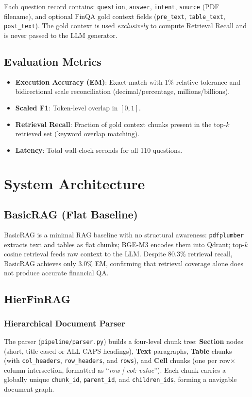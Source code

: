 \documentclass[conference]{IEEEtran}
\begin{document}
Each question record contains: \texttt{question}, \texttt{answer},
\texttt{intent}, \texttt{source} (PDF filename), and optional FinQA gold
context fields (\texttt{pre\_text}, \texttt{table\_text}, \texttt{post\_text}).
The gold context is used \emph{exclusively} to compute Retrieval Recall
and is never passed to the LLM generator.

\subsection{Evaluation Metrics}
\begin{itemize}
  \item \textbf{Execution Accuracy (EM)}: Exact-match with 1\% relative
        tolerance and bidirectional scale reconciliation (decimal/percentage,
        millions/billions).
  \item \textbf{Scaled F1}: Token-level overlap in $[0,1]$.
  \item \textbf{Retrieval Recall}: Fraction of gold context chunks present
        in the top-$k$ retrieved set (keyword overlap matching).
  \item \textbf{Latency}: Total wall-clock seconds for all 110 questions.
\end{itemize}

\section{System Architecture}

\subsection{BasicRAG (Flat Baseline)}
BasicRAG is a minimal RAG baseline with no structural awareness:
\texttt{pdfplumber} extracts text and tables as flat chunks; BGE-M3 encodes
them into Qdrant; top-$k$ cosine retrieval feeds raw context to the LLM.
Despite 80.3\% retrieval recall, BasicRAG achieves only 3.0\% EM, confirming
that retrieval coverage alone does not produce accurate financial QA.

\subsection{HierFinRAG}

\subsubsection{Hierarchical Document Parser}
The parser (\texttt{pipeline/parser.py}) builds a four-level chunk tree:
\textbf{Section} nodes (short, title-cased or ALL-CAPS headings),
\textbf{Text} paragraphs, \textbf{Table} chunks (with \texttt{col\_headers},
\texttt{row\_headers}, and \texttt{rows}), and \textbf{Cell} chunks (one per
row$\times$column intersection, formatted as ``\textit{row | col: value}'').
Each chunk carries a globally unique \texttt{chunk\_id}, \texttt{parent\_id},
and \texttt{children\_ids}, forming a navigable document graph.
\end{document}
